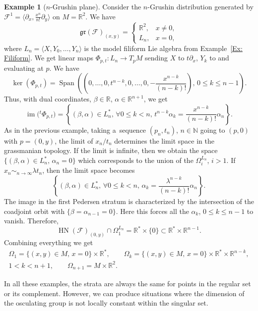 \documentclass[pdftex]{sigma}
\newcommand{\tsp}[1]{{}^t \! #1} %
\newcommand{\Span}{\operatorname{Span}} %
\newcommand{\im}{\operatorname{im}} %
\newcommand{\R}{\mathbb R} %
\newcommand{\N}{\mathbb N} %
\newcommand{\F}{\mathcal{F}} %
\newcommand{\lag}{\langle}
\newcommand{\rag}{\rangle}
\newcommand{\HN}{\operatorname{HN}} %
\newcommand{\Fb}{\mathcal{F}} %
\newcommand{\gr}{\mathfrak{gr}} %
\numberwithin{equation}{section}
\theoremstyle{definition}
\newtheorem{ex}[thm]{Example}
\begin{document}
\begin{ex}[$n$-Grushin plane] Consider the $n$-Grushin distribution generated by $\F^1 = \big\lag \partial_x, \frac{x^n}{n!}\partial_y\big\rag$ on $M = \R^2$. We have
\[
\gr(\Fb)_{(x,y)} =\begin{cases}
 \R^2,& x\neq 0,\\
 L_n, & x=0,
\end{cases}
\]
 where $L_n = \lag X,Y_0,\dots,Y_n\rag$ is the model filiform Lie algebra from Example~\ref{Ex: Filiform}. We get linear maps $\Phi_{p,t}\colon L_n \to T_pM$ sending $X$ to $t\partial_x$, $Y_k$ to  and evaluating at $p$. We have
 \[\ker(\Phi_{p,t}) = \Span \left( \left( 0,\dots,0,t^{n-k},0,\dots,0,-\frac{x^{n-k}}{(n-k)!}\right),\, 0\leq k \leq n-1\right).\]
 Thus, with dual coordinates, $\beta \in \R$, $\alpha\in \R^{n+1}$, we get
 \[\im\bigl(\tsp{}\Phi_{p,t}\bigr) = \left\lbrace(\beta,\alpha)\in L_n^*,\, \forall 0\leq k < n,\, t^{n-k}\alpha_k = \frac{x^{n-k}}{(n-k)!}\alpha_n\right\rbrace.\]
 As in the previous example, taking a~sequence $(p_n,t_n)$, $n\in \N$ going to $(p,0)$ with $p =(0,y)$, the limit of $x_n/t_n$ determines the limit space in the grassmanian topology. If the limit is infinite, then we obtain the space $\{(\beta,\alpha)\in L_n^*,\, \alpha_n = 0\}$ which corresponds to the union of the $\Omega_i^{L_n}$, $i> 1$. If~${x_n\sim_{n\to \infty}\lambda t_n}$, then the limit space becomes
 \[\left\lbrace (\beta,\alpha)\in L_n^*, \,\forall 0\leq k < n,\, \alpha_k = \frac{\lambda^{n-k}}{(n-k)!}\alpha_n\right\rbrace.\]
 The image in the first Pedersen stratum is characterized by the intersection of the coadjoint orbit with $\{\beta = \alpha_{n-1} = 0\}$. Here this forces all the $\alpha_k$, $0\leq k \leq n-1$ to vanish. Therefore,
 \[\HN(\Fb)_{(0,y)}\cap \Omega^{L_n}_1 = \R^* \times\{0\} \subset \R^* \times \R^{n-1}.\]
 Combining everything we get
 \begin{gather*}
 \Omega_1 = \{(x,y)\in M,\, x=0\} \times \R^* ,\qquad
 \Omega_k = \{(x,y)\in M,\, x=0\} \times \R^* \times \R^{n-k},\\ 1 <k < n+1,\qquad
 \Omega_{n+1} = M \times \R^2.
 \end{gather*}
\end{ex}

In all these examples, the strata are always the same for points in the regular set or its complement. However, we can produce situations where the dimension of the osculating group is not locally constant within the singular set.
\end{document}
